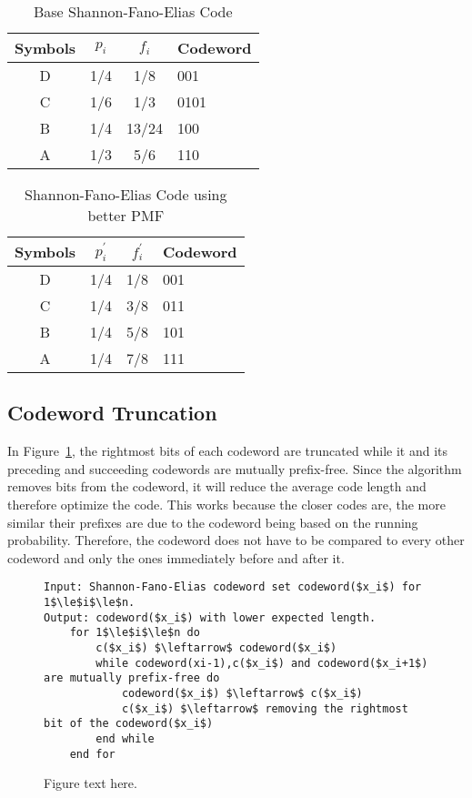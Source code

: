 \documentclass[10pt,letterpaper,notitlepage,draft]{article}
\theoremstyle{definition}
\begin{document}
\begin{table}[h]
\begin{center}
\begin{tabular}{|c|c|c|l|}
\hline
Symbols & $p_i$ & $f_i$ & Codeword \\ 
\hline 
\hline
D & 1/4 & 1/8 & 001 \\
\hline
C & 1/6 & 1/3 & 0101 \\
\hline
B & 1/4 & 13/24 & 100 \\
\hline
A & 1/3 & 5/6 & 110 \\
\hline
\end{tabular}
\end{center}
\caption{Base Shannon-Fano-Elias Code}\label{t1}
\end{table}

\begin{table}[h]
\begin{center}
\begin{tabular}{|c|c|c|l|}
\hline
Symbols & $p_i^\prime$ & $f_i^\prime$ & Codeword \\ 
\hline 
\hline
D & 1/4 & 1/8 & 001 \\
\hline
C & 1/4 & 3/8 & 011 \\
\hline
B & 1/4 & 5/8 & 101 \\
\hline
A & 1/4 & 7/8 & 111 \\
\hline
\end{tabular}
\end{center}
\caption{Shannon-Fano-Elias Code using better PMF}\label{t2}
\end{table}


\subsection{Codeword Truncation}
In Figure~\ref{f1}, the rightmost bits of each codeword are truncated while it and its preceding and succeeding codewords are mutually prefix-free. Since the algorithm removes bits from the codeword, it will reduce the average code length and therefore optimize the code. This works because the closer codes are, the more similar their prefixes are due to the codeword being based on the running probability. Therefore, the codeword does not have to be compared to every other codeword and only the ones immediately before and after it.

 \begin{figure}[h]
\caption{Figure text here.}\label{f1}
\begin{lstlisting}[breaklines]
Input: Shannon-Fano-Elias codeword set codeword($x_i$) for 1$\le$i$\le$n.
Output: codeword($x_i$) with lower expected length.
    for 1$\le$i$\le$n do
        c($x_i$) $\leftarrow$ codeword($x_i$)
        while codeword(xi-1),c($x_i$) and codeword($x_i+1$) are mutually prefix-free do
            codeword($x_i$) $\leftarrow$ c($x_i$)
            c($x_i$) $\leftarrow$ removing the rightmost bit of the codeword($x_i$)
        end while
    end for
\end{lstlisting}
\end{figure} 
\end{document}
